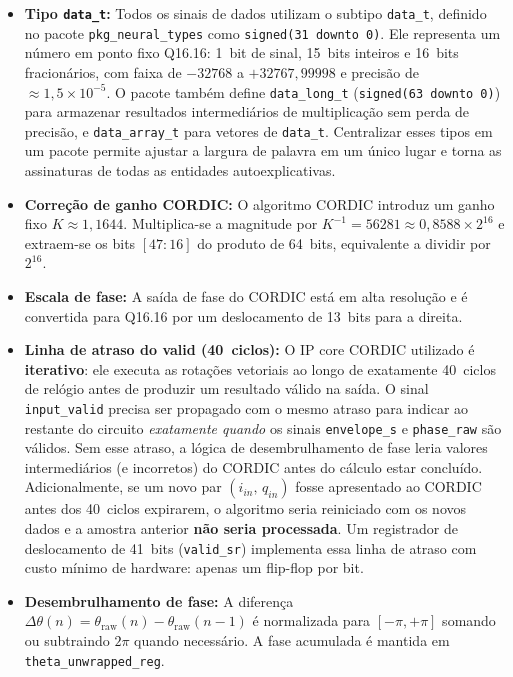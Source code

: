 \documentclass[a4paper,12pt]{article}
\begin{document}
\begin{itemize}
    \item \textbf{Tipo \texttt{data\_t}:} Todos os sinais de dados utilizam o subtipo \texttt{data\_t}, definido no pacote \texttt{pkg\_neural\_types} como \texttt{signed(31 downto 0)}. Ele representa um n\'umero em ponto fixo Q16.16: 1~bit de sinal, 15~bits inteiros e 16~bits fracion\'arios, com faixa de $-32768$ a $+32767{,}99998$ e precis\~ao de $\approx 1{,}5 \times 10^{-5}$. O pacote tamb\'em define \texttt{data\_long\_t} (\texttt{signed(63 downto 0)}) para armazenar resultados intermedi\'arios de multiplica\c{c}\~ao sem perda de precis\~ao, e \texttt{data\_array\_t} para vetores de \texttt{data\_t}. Centralizar esses tipos em um pacote permite ajustar a largura de palavra em um \'unico lugar e torna as assinaturas de todas as entidades autoexplicativas.

    \item \textbf{Corre\c{c}\~ao de ganho CORDIC:} O algoritmo CORDIC introduz um ganho fixo $K \approx 1{,}1644$. Multiplica-se a magnitude por $K^{-1} = 56281 \approx 0{,}8588 \times 2^{16}$ e extraem-se os bits $[47\!:\!16]$ do produto de 64~bits, equivalente a dividir por $2^{16}$.

    \item \textbf{Escala de fase:} A sa\'ida de fase do CORDIC est\'a em alta resolu\c{c}\~ao e \'e convertida para Q16.16 por um deslocamento de 13~bits para a direita.

    \item \textbf{Linha de atraso do valid (40~ciclos):} O IP core CORDIC utilizado \'e \textbf{iterativo}: ele executa as rota\c{c}\~oes vetoriais ao longo de exatamente 40~ciclos de rel\'ogio antes de produzir um resultado v\'alido na sa\'ida. O sinal \texttt{input\_valid} precisa ser propagado com o mesmo atraso para indicar ao restante do circuito \textit{exatamente quando} os sinais \texttt{envelope\_s} e \texttt{phase\_raw} s\~ao v\'alidos. Sem esse atraso, a l\'ogica de desembrulhamento de fase leria valores intermedi\'arios (e incorretos) do CORDIC antes do c\'alculo estar conclu\'ido. Adicionalmente, se um novo par $(i_{in},\, q_{in})$ fosse apresentado ao CORDIC antes dos 40~ciclos expirarem, o algoritmo seria reiniciado com os novos dados e a amostra anterior \textbf{n\~ao seria processada}. Um registrador de deslocamento de 41~bits (\texttt{valid\_sr}) implementa essa linha de atraso com custo m\'inimo de hardware: apenas um flip-flop por bit.

    \item \textbf{Desembrulhamento de fase:} A diferen\c{c}a $\Delta\theta(n) = \theta_{\text{raw}}(n) - \theta_{\text{raw}}(n{-}1)$ \'e normalizada para $[-\pi,+\pi]$ somando ou subtraindo $2\pi$ quando necess\'ario. A fase acumulada \'e mantida em \texttt{theta\_unwrapped\_reg}.
\end{itemize}
\end{document}
